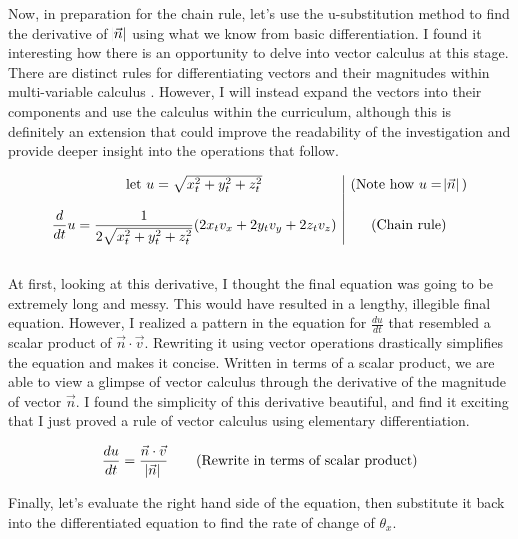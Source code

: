 \documentclass[12pt]{article}
\begin{document}
Now, in preparation for the chain rule, let's use the u-substitution method to find the derivative of $\abs{\vec n}$ using what we know from basic differentiation. I found it interesting how there is an opportunity to delve into vector calculus at this stage. There are distinct rules for differentiating vectors and their magnitudes within multi-variable calculus \autocite{multivar}. However, I will instead expand the vectors into their components and use the calculus within the curriculum, although this is definitely an extension that could improve the readability of the investigation and provide deeper insight into the operations that follow. 


$$
\begin{array}{c|c}
 \text{let } u = \sqrt{x_t^2+y_t^2+z_t^2} & \text{(Note how }u=\abs{\vec n} \text{)} \\ \\
 \dfrac{d}{dt} u = \dfrac{1}{2\sqrt{x_t^2+y_t^2+z_t^2}}(2x_tv_x + 2y_tv_y + 2z_tv_z) & \text{(Chain rule)}
\end{array}
$$
\\
At first, looking at this derivative, I thought the final equation was going to be extremely long and messy. This would have resulted in a lengthy, illegible final equation. However, I realized a pattern in the equation for $\frac{du}{dt}$ that resembled a scalar product of $\vec n \cdot \vec v$. Rewriting it using vector operations drastically simplifies the equation and makes it concise. Written in terms of a scalar product, we are able to view a glimpse of vector calculus through the derivative of the magnitude of vector $\vec n$. I found the simplicity of this derivative beautiful, and find it exciting that I just proved a rule of vector calculus using elementary differentiation. 


$$\frac{du}{dt} = \frac{\vec n \cdot \vec v}{\abs{\vec n}} \quad \quad \text{(Rewrite in terms of scalar product)}$$

Finally, let's evaluate the right hand side of the equation, then substitute it back into the differentiated equation to find the rate of change of $\theta_x$.
\end{document}
